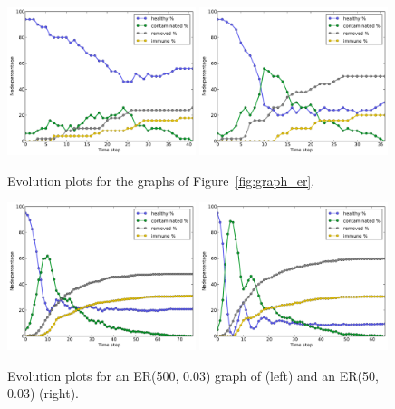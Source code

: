 \documentclass[11pt]{article} %
\begin{document}
\begin{figure}[t]
  \centering
  \includegraphics[width=0.49\textwidth]{figures/ER_evo_50_01}
  \includegraphics[width=0.49\textwidth]{figures/ER_evo_50_03}
  \caption{Evolution plots for the graphs of Figure~\ref{fig:graph_er}.}
    \label{fig:evo_er1}
\end{figure}

\begin{figure}[t]
  \centering
  \includegraphics[width=0.49\textwidth]{figures/ER_evo_500_003}
  \includegraphics[width=0.49\textwidth]{figures/ER_evo_500_007}
  \caption{Evolution plots for an ER(500, 0.03) graph of (left) and an
    ER(50, 0.03) (right).}
    \label{fig:evo_er2}
\end{figure}



\end{document}
